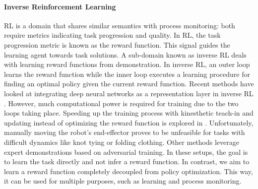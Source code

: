 \documentclass[\home/main.tex]{subfiles}
\begin{document}
\paragraph{Inverse Reinforcement Learning}
\gls{RL} is a domain that shares similar semantics with process monitoring: both require metrics indicating task progression and quality. In RL, the task progression metric is known as the reward function. This signal guides the learning agent towards task solutions. A sub-domain known as inverse RL \autocite{Ng2000} deals with learning reward functions from demonstration. In inverse RL, an outer loop learns the reward function while the inner loop executes a learning procedure for finding an optimal policy given the current reward function. Recent methods have looked at integrating deep neural networks as a representation layer in inverse RL \autocite{Finn2016,Ho2016,Fu2018}. However, much computational power is required for training due to the two loops taking place. Speeding up the training process with kinesthetic teach-in and updating instead of optimizing the reward function is explored in \autocite{Finn2016}. Unfortunately, manually moving the robot's end-effector proves to be unfeasible for tasks with difficult dynamics like knot tying or folding clothing. Other methods \autocite{Ho2016,Fu2018} leverage expert demonstrations based on adversarial training. In these setups, the goal is to learn the task directly and not infer a reward function. In contrast, we aim to learn a reward function completely decoupled from policy optimization. This way, it can be used for multiple purposes, such as learning and process monitoring.
\end{document}
